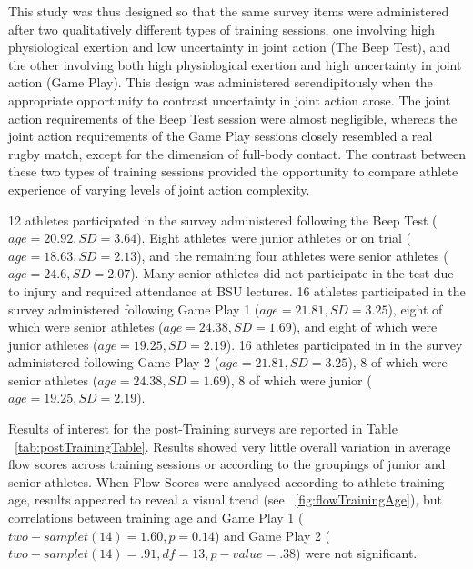 \begin{CJK}{UTF8}{gbsn}
This study was thus designed so that the same survey items were administered after two qualitatively different types of training sessions, one involving high physiological exertion and low uncertainty in joint action (The Beep Test), and the other involving both high physiological exertion and high uncertainty in joint action (Game Play).   This design was administered serendipitously when the appropriate opportunity to contrast uncertainty in joint action arose.  The joint action requirements of the Beep Test session were almost negligible, whereas the joint action requirements of the Game Play sessions closely resembled a real rugby match, except for the dimension of full-body contact.  The contrast between these two types of training sessions provided the opportunity to compare athlete experience of varying levels of joint action complexity.

12 athletes participated in the survey administered following the Beep Test ($age = 20.92, SD = 3.64$). Eight athletes were junior athletes or on trial ($age = 18.63, SD = 2.13$), and the remaining four athletes were senior athletes ($age = 24.6, SD = 2.07$).  Many senior athletes did not participate in the test due to injury and required attendance at BSU lectures.  16 athletes participated in the survey administered following Game Play 1 ($age = 21.81, SD = 3.25$), eight of which were senior athletes ($age = 24.38, SD =1.69$), and eight of which were junior athletes ($age = 19.25, SD = 2.19$).  16 athletes participated in in the survey administered following Game Play 2 ($age = 21.81, SD = 3.25$), 8 of which were senior athletes ($age = 24.38, SD =1.69$), 8 of which were junior ($age = 19.25, SD = 2.19$).



Results of interest for the post-Training surveys are reported in Table ~\ref{tab:postTrainingTable}.  Results showed very little overall variation in average flow scores across training sessions or according to the groupings of junior and senior athletes.  When Flow Scores were analysed according to athlete training age, results appeared to reveal a visual trend (see ~\ref{fig:flowTrainingAge}), but correlations between training age and Game Play 1 ($two-sample t(14) = 1.60, p = 0.14$)  and Game Play 2  ($two-sample t(14) = .91, df = 13, p-value = .38$) were not significant.


\end{CJK}
